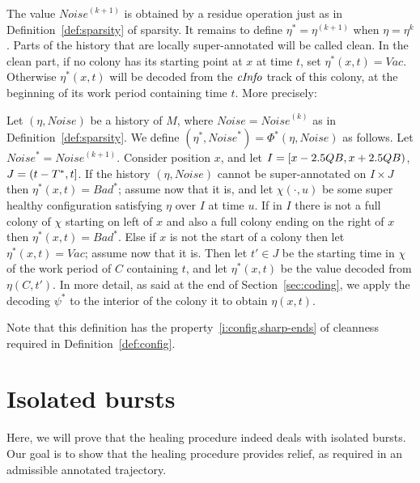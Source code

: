\documentclass[12pt]{memoir}
\newcommand{\fld}[1]{\ensuremath{\textit{#1\/}}}
\def\B{B}
\newcommand{\Bad}{\mathit{Bad}}
\newcommand{\Vacant}{\mathit{Vac}}
\newcommand{\Noise}{\mathit{Noise}}
\newcommand{\Q}{Q}
\newcommand{\Tus}{T^{*}}
\newcommand{\cInfo}{\fld{cInfo}}
\begin{document}
The value \( \Noise^{(k+1)} \) is obtained by a residue operation
just as in Definition~\ref{def:sparsity} of sparsity.
It remains to define \( \eta^{*}=\eta^{(k+1)} \) when \( \eta=\eta^{k} \).
Parts of the history that are locally super-annotated will be called clean.
In the clean part,
if no colony has its starting point at \( x \) at time \( t \), set \( \eta^{*}(x,t)=\Vacant \).
Otherwise \( \eta^{*}(x,t) \) will be decoded from
the \( \cInfo \) track of this colony, at the beginning of its work period 
containing time \( t \).
More precisely:

\begin{definition}[Scale-up]\label{def:scaleup}
Let \( (\eta,\Noise) \) be a history of \( M \), where \( \Noise=\Noise^{(k)} \)
as in Definition~\ref{def:sparsity}.
We define \( (\eta^{*},\Noise^{*})=\Phi^{*}(\eta,\Noise) \) as follows.
Let \( \Noise^{*}=\Noise^{(k+1)} \).
Consider position \( x \), and let \( I=\lint{x-2.5\Q\B}{x+2.5\Q\B} \),
\( J=\rint{t-\Tus}{t} \).
If the history \( (\eta,\Noise) \) cannot be super-annotated on \( I\times J \)
then \( \eta^{*}(x,t)=\Bad^{*} \); assume now that it is, and let
\( \chi(\cdot,u) \) be some super healthy configuration satisfying \( \eta \) over 
\( I \) at time \( u \).
If in \( I \) there is not a full colony of \( \chi \) starting on left of \( x \) and also a full colony 
ending on the right of \( x \) then \( \eta^{*}(x,t)=\Bad^{*} \). 
Else if \( x \) is not the start of a colony then let \( \eta^{*}(x,t)=\Vacant \); assume now that it is.
Then let \( t'\in J \) be the starting time in \( \chi \) of the work period of \( C \)
containing \( t \), and let \( \eta^{*}(x,t) \) be the value decoded from \( \eta(C,t') \).
In more detail, as said at the end of Section~\ref{sec:coding}, we apply the decoding
\( \psi^{*} \) to the interior of the colony it to obtain \( \eta(x,t) \).
\end{definition}

Note that this definition has the property~\eqref{i:config.sharp-ends} of cleanness required
in Definition~\ref{def:config}.

\section{Isolated bursts}\label{sec:1-level-noise}

Here, we will prove that the healing procedure indeed deals with isolated bursts.
Our goal is to show that the healing procedure provides relief, as required in an
admissible annotated trajectory.
\end{document}
